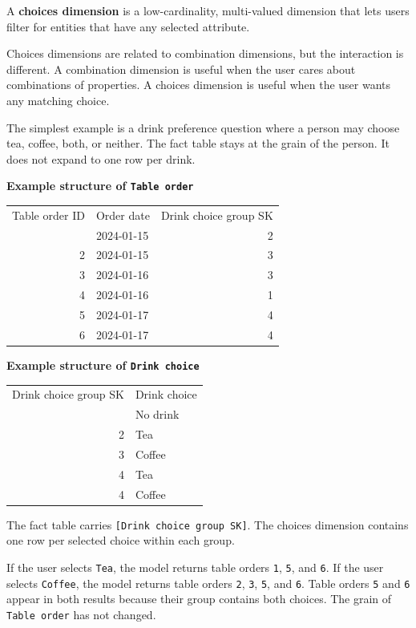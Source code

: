 \documentclass[10pt,openany,10pt]{book}
\newcounter{none}
\let\podeToprule\toprule
\let\podeMidrule\midrule
\let\podeBottomrule\bottomrule
\renewcommand{\toprule}{\arrayrulecolor{pbiGrid}\podeToprule}
\renewcommand{\midrule}{\arrayrulecolor{pbiGrid}\podeMidrule}
\renewcommand{\bottomrule}{\arrayrulecolor{pbiGrid}\podeBottomrule}
\begin{document}
A \textbf{choices dimension} is a low-cardinality, multi-valued
dimension that lets users filter for entities that have any selected
attribute.

Choices dimensions are related to combination dimensions, but the
interaction is different. A combination dimension is useful when the
user cares about combinations of properties. A choices dimension is
useful when the user wants any matching choice.

The simplest example is a drink preference question where a person may
choose tea, coffee, both, or neither. The fact table stays at the grain
of the person. It does not expand to one row per drink.

\textbf{Example structure of
\texttt{\textquotesingle{}Table\ order\textquotesingle{}}}

{\def\LTcaptype{none} %
\begin{longtable}[]{@{}rlr@{}}
\toprule\noalign{}
Table order ID & Order date & Drink choice group SK \\
\midrule\noalign{}
\endhead
\bottomrule\noalign{}
\endlastfoot
1 & 2024-01-15 & 2 \\
2 & 2024-01-15 & 3 \\
3 & 2024-01-16 & 3 \\
4 & 2024-01-16 & 1 \\
5 & 2024-01-17 & 4 \\
6 & 2024-01-17 & 4 \\
\end{longtable}
}

\textbf{Example structure of
\texttt{\textquotesingle{}Drink\ choice\textquotesingle{}}}

{\def\LTcaptype{none} %
\begin{longtable}[]{@{}rl@{}}
\toprule\noalign{}
Drink choice group SK & Drink choice \\
\midrule\noalign{}
\endhead
\bottomrule\noalign{}
\endlastfoot
1 & No drink \\
2 & Tea \\
3 & Coffee \\
4 & Tea \\
4 & Coffee \\
\end{longtable}
}

The fact table carries \texttt{{[}Drink\ choice\ group\ SK{]}}. The
choices dimension contains one row per selected choice within each
group.

If the user selects \texttt{Tea}, the model returns table orders
\texttt{1}, \texttt{5}, and \texttt{6}. If the user selects
\texttt{Coffee}, the model returns table orders \texttt{2}, \texttt{3},
\texttt{5}, and \texttt{6}. Table orders \texttt{5} and \texttt{6}
appear in both results because their group contains both choices. The
grain of \texttt{\textquotesingle{}Table\ order\textquotesingle{}} has
not changed.
\end{document}
